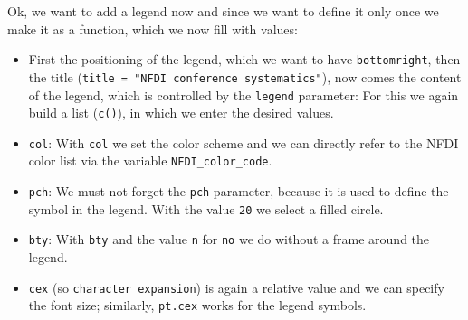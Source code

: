 \documentclass[11pt]{article}
\providecommand{\tightlist}{%
      \setlength{\itemsep}{0pt}\setlength{\parskip}{0pt}}
\begin{document}
    Ok, we want to add a legend now and since we want to define it only once
we make it as a function, which we now fill with values:

\begin{itemize}
\tightlist
\item
  First the positioning of the legend, which we want to have
  \texttt{bottomright}, then the title
  (\texttt{title\ =\ "NFDI\ conference\ systematics"}), now comes the
  content of the legend, which is controlled by the \texttt{legend}
  parameter: For this we again build a list (\texttt{c()}), in which we
  enter the desired values.
\item
  \texttt{col}: With \texttt{col} we set the color scheme and we can
  directly refer to the NFDI color list via the variable
  \texttt{NFDI\_color\_code}.
\item
  \texttt{pch}: We must not forget the \texttt{pch} parameter, because
  it is used to define the symbol in the legend. With the value
  \texttt{20} we select a filled circle.
\item
  \texttt{bty}: With \texttt{bty} and the value \texttt{n} for
  \texttt{no} we do without a frame around the legend.
\item
  \texttt{cex} (so \texttt{character\ expansion}) is again a relative
  value and we can specify the font size; similarly, \texttt{pt.cex}
  works for the legend symbols.
\end{itemize}
\end{document}

